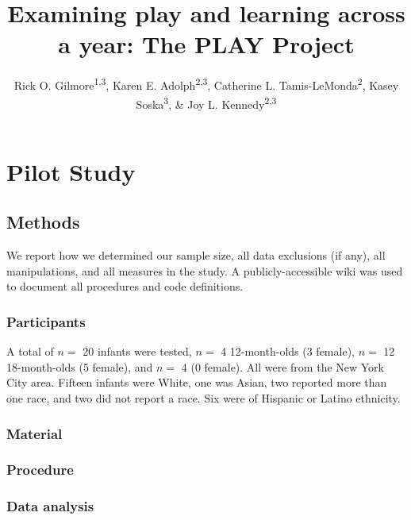 \documentclass[english,man]{apa6}
\title{Examining play and learning across a year: The PLAY Project}
\author{Rick O. Gilmore\textsuperscript{1,3}, Karen E. Adolph\textsuperscript{2,3}, Catherine L. Tamis-LeMonda\textsuperscript{2}, Kasey Soska\textsuperscript{3}, \& Joy L. Kennedy\textsuperscript{2,3}}
\affiliation{
    \vspace{0.5cm}
          \textsuperscript{1} The Pennsylvania State University\\
          \textsuperscript{2} New York University\\
          \textsuperscript{3} Databrary.org  }
\theoremstyle{definition}
\theoremstyle{definition}
\theoremstyle{definition}
\theoremstyle{remark}
\begin{document}
\maketitle

\setcounter{secnumdepth}{0}



\section{Pilot Study}\label{pilot-study}

\subsection{Methods}\label{methods}

We report how we determined our sample size, all data exclusions (if
any), all manipulations, and all measures in the study. A
publicly-accessible wiki \cite{PLAY-wiki} was used to document all
procedures and code definitions.

\subsubsection{Participants}\label{participants}

A total of \(n=\) 20 infants were tested, \(n=\) 4 12-month-olds (3
female), \(n=\) 12 18-month-olds (5 female), and \(n=\) 4 (0 female).
All were from the New York City area. Fifteen infants were White, one
was Asian, two reported more than one race, and two did not report a
race. Six were of Hispanic or Latino ethnicity.

\subsubsection{Material}\label{material}

\subsubsection{Procedure}\label{procedure}

\subsubsection{Data analysis}\label{data-analysis}
\end{document}
